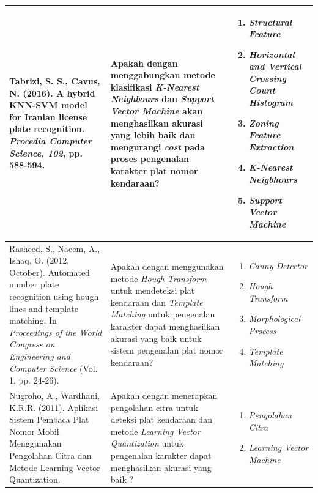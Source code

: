 \begin{small}
\begin{longtable}{ |p{5cm}|p{3.5cm}|p{3.6cm}| }
\hline
Tabrizi, S. S., Cavus, N. (2016). A hybrid KNN-SVM model for Iranian license plate recognition. \emph{Procedia Computer Science, 102}, pp. 588-594. & Apakah dengan menggabungkan metode klasifikasi \textit{K-Nearest Neighbours} dan \textit{Support Vector Machine} akan menghasilkan akurasi yang lebih baik dan mengurangi \textit{cost} pada proses pengenalan karakter plat nomor kendaraan? &
\begin{enumerate}[wide, labelwidth=!, labelindent=0pt, topsep=0pt]
\item \textit{Structural Feature}
\item \textit{Horizontal and Vertical Crossing Count Histogram}
\item \textit{Zoning Feature Extraction}
\item \textit{K-Nearest Neigbhours}
\item \textit{Support Vector Machine}
\end{enumerate}\\
\hline
Rasheed, S., Naeem, A., Ishaq, O. (2012, October). Automated number plate recognition using hough lines and template matching. In \emph{Proceedings of the World Congress on Engineering and Computer Science} (Vol. 1, pp. 24-26). & Apakah dengan menggunakan metode \textit{Hough Transform} untuk mendeteksi plat kendaraan dan \textit{Template Matching} untuk pengenalan karakter dapat menghasilkan akurasi yang baik untuk sistem pengenalan plat nomor kendaraan? &
\begin{enumerate}[wide, labelwidth=!, labelindent=0pt, topsep=0pt]
	\item \textit{Canny Detector}
	\item \textit{Hough Transform}
	\item \textit{Morphological Process}
	\item \textit{Template Matching}
\end{enumerate}\\
\hline
Nugroho, A., Wardhani, K.R.R. (2011). Aplikasi Sistem Pembaca Plat Nomor Mobil Menggunakan Pengolahan Citra dan Metode Learning Vector Quantization. & Apakah dengan menerapkan pengolahan citra untuk deteksi plat kendaraan dan metode \textit{Learning Vector Quantization} untuk pengenalan karakter dapat menghasilkan akurasi yang baik ? &
\begin{enumerate}[wide, labelwidth=!, labelindent=0pt, topsep=0pt]
	\item \textit{Pengolahan Citra}
	\item \textit{Learning Vector Machine}
\end{enumerate}
\label{tbl:StateoftheArt}\\
\hline
\end{longtable}
\end{small}
\endgroup
 
